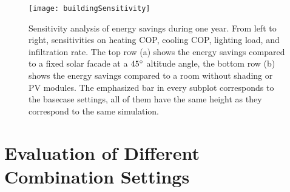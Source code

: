 	\begin{figure*}
		\begin{center}
		\texttt{[image: buildingSensitivity]}
		\caption{Sensitivity analysis of energy savings during one year. From left to right, sensitivities on heating COP, cooling COP, lighting load, and infiltration rate. The top row (a) shows the energy savings compared to a fixed solar facade at a $45\degree$ altitude angle, the bottom row (b) shows the energy savings compared to a room without shading or PV modules. The emphasized bar in every subplot corresponds to the basecase settings, all of them have the same height as they correspond to the same simulation. }
		\label{fig:sensitivity}
		\end{center}
	\end{figure*}

\section{Evaluation of Different Combination Settings}
	
